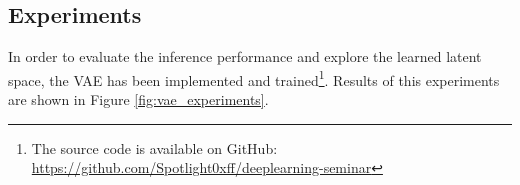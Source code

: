 \subsection{Experiments}
In order to evaluate the inference performance and explore the learned latent space, the VAE has been implemented and trained\footnote{The source code is available on GitHub: \url{https://github.com/Spotlight0xff/deeplearning-seminar}}. Results of this experiments are shown in Figure \ref{fig:vae_experiments}.









